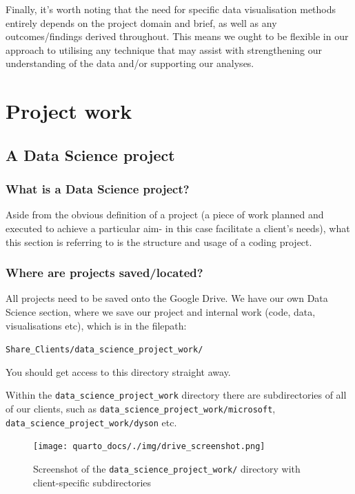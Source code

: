 \documentclass[
  letterpaper,
  DIV=11,
  numbers=noendperiod]{scrreprt}
\begin{document}
Finally, it's worth noting that the need for specific data visualisation
methods entirely depends on the project domain and brief, as well as any
outcomes/findings derived throughout. This means we ought to be flexible
in our approach to utilising any technique that may assist with
strengthening our understanding of the data and/or supporting our
analyses.

\part{Project work}

\chapter{A Data Science project}\label{a-data-science-project}

\section{What is a Data Science
project?}\label{what-is-a-data-science-project}

Aside from the obvious definition of a project (a piece of work planned
and executed to achieve a particular aim- in this case facilitate a
client's needs), what this section is referring to is the structure and
usage of a coding project.

\section{Where are projects
saved/located?}\label{where-are-projects-savedlocated}

All projects need to be saved onto the Google Drive. We have our own
Data Science section, where we save our project and internal work (code,
data, visualisations etc), which is in the filepath:

\texttt{Share\_Clients/data\_science\_project\_work/}

You should get access to this directory straight away.

Within the \texttt{data\_science\_project\_work} directory there are
subdirectories of all of our clients, such as
\texttt{data\_science\_project\_work/microsoft},
\texttt{data\_science\_project\_work/dyson} etc.

\begin{figure}[H]

{\centering \texttt{[image: quarto\_docs/./img/drive\_screenshot.png]}

}

\caption{Screenshot of the \texttt{data\_science\_project\_work/}
directory with client-specific subdirectories}

\end{figure}%
\end{document}
